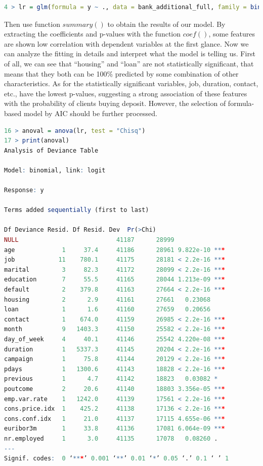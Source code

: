 \documentclass[12pt, a4paper, bibliography=totoc, english]{scrartcl}
\begin{document}
\begin{lstlisting}[language = R]
4 > lr = glm(formula = y ~ ., data = bank_additional_full, family = binomial(link = "logit"))
\end{lstlisting}

Then use function $summary()$ to obtain the results of our model. By extracting the coefficients and p-values with the function $coef()$, some features are shown low correlation with dependent variables at the first glance. Now we can analyze the fitting in details and interpret what the model is telling us. First of all, we can see that “housing” and “loan” are not statistically significant, that means that they both can be 100\% predicted by some combination of other characteristics. As for the statistically significant variables, job, duration, contact, etc., have the lowest p-values, suggesting a strong association of these features with the probability of clients buying deposit. However, the selection of formula-based model by AIC should be further processed.

\begin{lstlisting}[language = R]
16 > anoval = anova(lr, test = "Chisq")  
17 > print(anoval)
Analysis of Deviance Table

Model: binomial, link: logit

Response: y

Terms added sequentially (first to last)

Df Deviance Resid. Df Resid. Dev  Pr(>Chi)    
NULL                           41187      28999              
age             1     37.4     41186      28961 9.822e-10 ***
job            11    780.1     41175      28181 < 2.2e-16 ***
marital         3     82.3     41172      28099 < 2.2e-16 ***
education       7     55.5     41165      28044 1.213e-09 ***
default         2    379.8     41163      27664 < 2.2e-16 ***
housing         2      2.9     41161      27661   0.23068    
loan            1      1.6     41160      27659   0.20656    
contact         1    674.0     41159      26985 < 2.2e-16 ***
month           9   1403.3     41150      25582 < 2.2e-16 ***
day_of_week     4     40.1     41146      25542 4.220e-08 ***
duration        1   5337.3     41145      20204 < 2.2e-16 ***
campaign        1     75.8     41144      20129 < 2.2e-16 ***
pdays           1   1300.6     41143      18828 < 2.2e-16 ***
previous        1      4.7     41142      18823   0.03082 *  
poutcome        2     20.6     41140      18803 3.356e-05 ***
emp.var.rate    1   1242.0     41139      17561 < 2.2e-16 ***
cons.price.idx  1    425.2     41138      17136 < 2.2e-16 ***
cons.conf.idx   1     21.0     41137      17115 4.655e-06 ***
euribor3m       1     33.8     41136      17081 6.064e-09 ***
nr.employed     1      3.0     41135      17078   0.08260 .  
---
Signif. codes:  0 ‘***’ 0.001 ‘**’ 0.01 ‘*’ 0.05 ‘.’ 0.1 ‘ ’ 1

\end{lstlisting}
\end{document}
